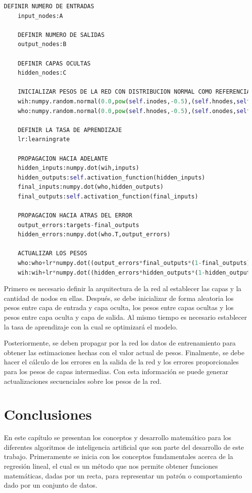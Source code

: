 {\begin{lstlisting}[language=Python,numbers=none]
	DEFINIR NUMERO DE ENTRADAS 
	input_nodes:A

	DEFINIR NUMERO DE SALIDAS
	output_nodes:B

	DEFINIR CAPAS OCULTAS
	hidden_nodes:C

	INICIALIZAR PESOS DE LA RED CON DISTRIBUCION NORMAL COMO REFERENCIA
	wih:numpy.random.normal(0.0,pow(self.inodes,-0.5),(self.hnodes,self.inodes))
	who:numpy.random.normal(0.0,pow(self.hnodes,-0.5),(self.onodes,self.hnodes))

	DEFINIR LA TASA DE APRENDIZAJE
	lr:learningrate

	PROPAGACION HACIA ADELANTE
	hidden_inputs:numpy.dot(wih,inputs)
	hidden_outputs:self.activation_function(hidden_inputs)
	final_inputs:numpy.dot(who,hidden_outputs)
	final_outputs:self.activation_function(final_inputs)

	PROPAGACION HACIA ATRAS DEL ERROR
	output_errors:targets-final_outputs
	hidden_errors:numpy.dot(who.T,output_errors)

	ACTUALIZAR LOS PESOS
	who:who+lr*numpy.dot((output_errors*final_outputs*(1-final_outputs)),numpy.transpose(hidden_outputs))
	wih:wih+lr*numpy.dot((hidden_errors*hidden_outputs*(1-hidden_outputs)),numpy.transpose(inputs))
\end{lstlisting}

Primero es necesario definir la arquitectura de la red al establecer las capas y la cantidad de nodos en ellas. Después, se debe inicializar de forma aleatoria los pesos entre capa de entrada y capa oculta, los pesos entre 
capas ocultas y los pesos entre capa oculta y capa de salida. Al mismo tiempo es necesario establecer la tasa de aprendizaje con la cual se optimizará el modelo.

Posteriormente, se deben propagar por la red los datos de entrenamiento para obtener las estimaciones hechas con el valor actual de pesos. Finalmente, se debe hacer el cálculo de los errores en la salida de la red y los 
errores proporcionales para los pesos de capas intermedias. Con esta información se puede generar actualizaciones secuenciales sobre los pesos de la red. 

\section{Conclusiones}

En este capítulo se presentan los conceptos y desarrollo matemático para los diferentes algoritmos de inteligencia artificial que son parte del desarrollo de este trabajo. Primeramente se inicia con los conceptos fundamentales 
acerca de la regresión lineal, el cual es un método que nos permite obtener funciones matemáticas, dadas por un recta, para representar un patrón o comportamiento dado por un conjunto de datos.

}
